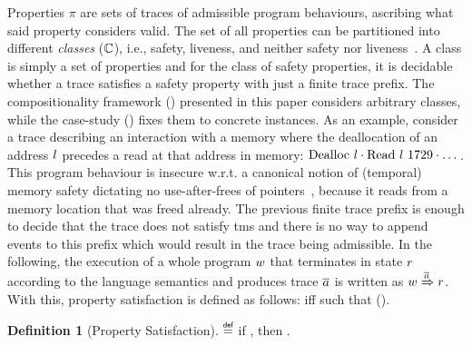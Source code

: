 \documentclass[dvipsnames,conference]{IEEEtran}
\theoremstyle{definition}
\newtheorem{definition}{Definition}[section]
\begin{document}
Properties $\pi$ are sets of traces of admissible program behaviours, ascribing what said property considers valid.
The set of all properties can be partitioned into different {\em classes} ($\mathbb{C}$), i.e., safety, liveness, and neither safety nor liveness~\cite{clarkson2008hyper}.
A class is simply a set of properties and for the class of safety properties, it is decidable whether a trace satisfies a safety property with just a finite trace prefix.
The compositionality framework () presented in this paper considers arbitrary classes, while the case-study () fixes them to concrete instances.
As an example, consider a trace describing an interaction with a memory where the deallocation of an address $l$ precedes a read at that address in memory: $\ev{Dealloc\ \loc}\cdot\ev{Read\ \loc\ 1729}\cdot\dots$.
This program behaviour is insecure w.r.t. a canonical notion of (temporal) memory safety dictating no use-after-frees of pointers~\cite{nagarakatte2010cets,azevedo2018meaningsofms}, because it reads from a memory location that was freed already.
The previous finite trace prefix is enough to decide that the trace does not satisfy \gls*{tms} and there is no way to append events to this prefix which would result in the trace being admissible.
In the following, the execution of a whole program $w$ that terminates in state $r$ according to the language semantics and produces trace $\overline{a}$ is written as $\progstepto{\wholeprogvar}{\runtimetermvar}{\trace}$.
With this, property satisfaction is defined as follows:
 iff  such that  ().

\begin{definition}[Property Satisfaction]\label{def:propsat}
    \bul{$\sat{\progvar}{\pi}$}
    $\isdef$
    if \iul{$\forall\runtimetermvar\ \trace,\progstepto{\progvar}{\runtimetermvar}{\trace}$},
    then \oul{$\trace\in\pi$}.
\end{definition}
\end{document}
